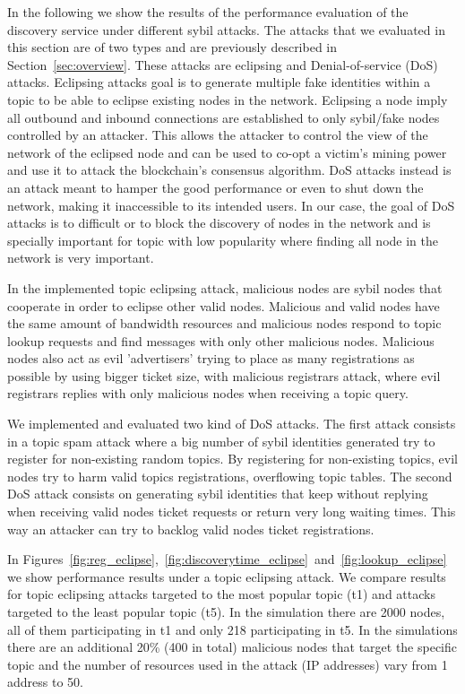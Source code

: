 In the following we show the results of the performance evaluation of the discovery service under different sybil attacks.  The attacks that we evaluated in this section are of two types and are previously described in Section~\ref{sec:overview}. 
These attacks are eclipsing  and Denial-of-service (DoS) attacks.
Eclipsing attacks goal is to generate multiple fake identities within a topic to be able to eclipse existing nodes in the network.
Eclipsing a node imply all outbound and inbound connections are established to only sybil/fake nodes controlled by an attacker.
This allows the attacker to control the view of the network of the eclipsed node and can be used to co-opt a victim's mining power and use it to attack the blockchain's consensus algorithm.
DoS attacks instead is an attack meant to hamper the good performance or even to shut down the network, making it inaccessible to its intended users.  
In our case,  the goal of DoS attacks is to difficult or to block the discovery of nodes in the network and is specially important for topic with low popularity where finding all node in the network is very important.

In the implemented topic eclipsing attack,  malicious nodes are sybil nodes that cooperate in order to eclipse other valid nodes.
Malicious and valid nodes have the same amount of bandwidth resources and malicious nodes respond to topic lookup requests and find messages with only other malicious nodes.
Malicious nodes also act as evil 'advertisers' trying to place as many registrations as possible by using bigger ticket size,  with malicious registrars attack,  where evil registrars replies with only malicious nodes when receiving a topic query.

We implemented and evaluated two kind of DoS attacks.  
The first attack consists in a topic spam attack where a big number of sybil identities generated try to register for non-existing random topics.
By registering for non-existing topics,  evil nodes try to harm valid topics registrations, overflowing topic tables.
The second DoS attack consists on generating sybil identities that keep without replying when receiving valid nodes ticket requests or return very long waiting times. 
This way an attacker can try to backlog valid nodes ticket registrations.

In Figures~\ref{fig:reg_eclipse},~\ref{fig:discoverytime_eclipse}~and~\ref{fig:lookup_eclipse} we show performance results under a
topic eclipsing attack.
We compare results for topic eclipsing attacks targeted to the most popular topic (t1) and attacks targeted to the least popular topic (t5). 
In the simulation there are 2000 nodes, all of them participating in t1 and only 218 participating in t5. 
In the simulations there are an additional 20\% (400 in total) malicious nodes that target the specific topic and the number of resources used in the attack (IP addresses) vary from 1 address to 50.

